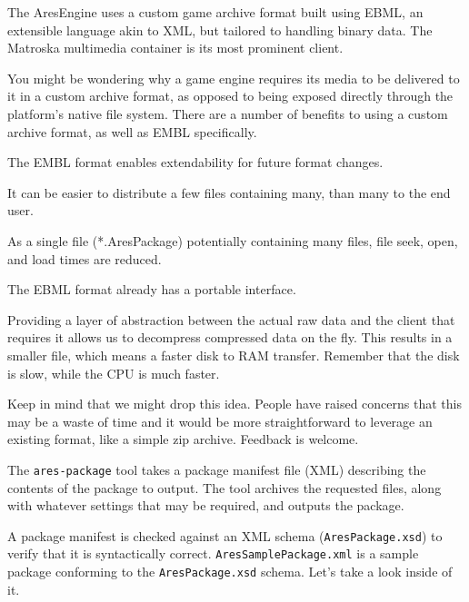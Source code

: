 


The AresEngine uses a custom game archive format built using EBML, an extensible language akin to XML, but tailored to handling binary data. The Matroska multimedia container is its most prominent client.

You might be wondering why a game engine requires its media to be delivered to it in a custom archive format, as opposed to being exposed  directly through the platform's native file system. There are a number of benefits to using a custom archive format, as well as EMBL specifically.

\startitemize[4]
\item
The EMBL format enables extendability for future format changes.

\item
It can be easier to distribute a few files containing many, than many to the end user.

\item
As a single file (*.AresPackage) potentially containing many files, file seek, open, and load times are reduced.

\item
The EBML format already has a portable interface.

\item
Providing a layer of abstraction between the actual raw data and the client that requires it allows us to decompress compressed data on the fly. This results in a smaller file, which means a faster disk to RAM transfer. Remember that the disk is slow, while the CPU is much faster.
\stopitemize

Keep in mind that we might drop this idea. People have raised concerns that this may be a waste of time and it would be more straightforward to leverage an existing format, like a simple zip archive. Feedback is welcome.

The {\tt ares-package} tool takes a package manifest file (XML) describing the contents of the package to output. The tool archives the requested files, along with whatever settings that may be required, and outputs the package.

A package manifest is checked against an XML schema ({\tt AresPackage.xsd}) to verify that it is syntactically correct. {\tt AresSamplePackage.xml} is a sample package conforming to the {\tt AresPackage.xsd} schema. Let's take a look inside of it.

